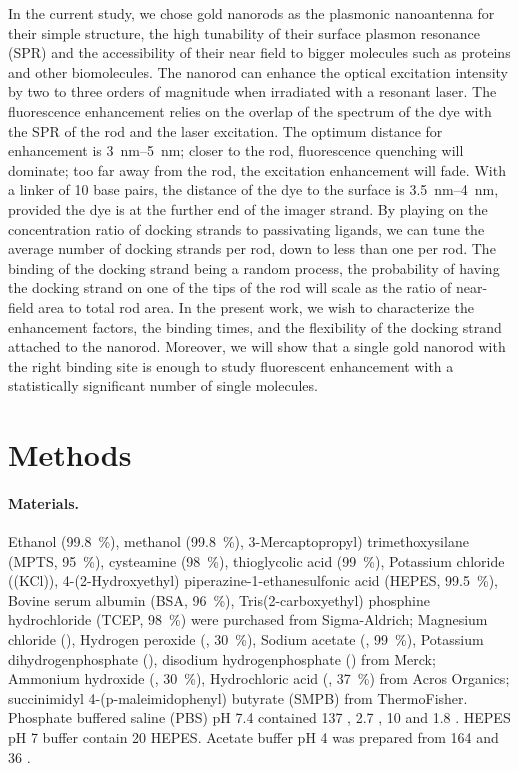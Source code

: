 In the current study, we chose gold nanorods as the plasmonic nanoantenna for their simple structure, the high tunability of their surface plasmon resonance (SPR) and the accessibility of their near field to bigger molecules such as proteins and other biomolecules.
The nanorod can enhance the optical excitation intensity by two to three orders of magnitude when irradiated with a resonant laser.
The fluorescence enhancement relies on the overlap of the spectrum of the dye with the SPR of the rod and the laser excitation.
The optimum distance for enhancement is \SIrange{3}{5}{\nm}; closer to the rod, fluorescence quenching will dominate; too far away from the rod, the excitation enhancement will fade.\cite{khatua2014resonant}
With a linker of 10 base pairs, the distance of the dye to the surface is \SIrange{3.5}{4}{\nm}, provided the dye is at the further end of the imager strand.
By playing on the concentration ratio of docking strands to passivating ligands, we can tune the average number of docking strands per rod, down to less than one per rod. The binding of the docking strand being a random process, the probability of having the docking strand on one of the tips of the rod will scale as the ratio of near-field area to total rod area.
In the present work, we wish to characterize the enhancement factors, the binding times, and the flexibility of the docking strand attached to the nanorod. Moreover, we will show that a single gold nanorod with the right binding site is enough to study fluorescent enhancement with a statistically significant number of single molecules.

\section{Methods}
\paragraph*{Materials.} Ethanol (\SI{99.8}{\percent}), methanol (\SI{99.8}{\percent}), 3-Mercaptopropyl) trimethoxysilane (MPTS, \SI{95}{\percent}), cysteamine (\SI{98}{\percent}), thioglycolic acid (\SI{99}{\percent}), Potassium chloride (\ce(KCl)), 4-(2-Hydroxyethyl) piperazine-1-ethanesulfonic acid (HEPES, \SI{99.5}{\percent}), Bovine serum albumin (BSA, \SI{96}{\percent}), Tris(2-carboxyethyl) phosphine hydrochloride (TCEP, \SI{98}{\percent}) were purchased from Sigma-Aldrich; 
Magnesium chloride (), Hydrogen peroxide (, \SI{30}{\percent}), Sodium acetate (, \SI{99}{\percent}), Potassium dihydrogenphosphate (), disodium hydrogenphosphate () from Merck;
Ammonium hydroxide (, \SI{30}{\percent}), Hydrochloric acid (, \SI{37}{\percent}) from Acros Organics;
succinimidyl 4-(p-maleimidophenyl) butyrate (SMPB) from ThermoFisher.
Phosphate buffered saline (PBS) pH 7.4 contained \SI{137}{\mM} , \SI{2.7}{\mM} , \SI{10}{\mM}  and \SI{1.8}{\mM} .
HEPES pH 7 buffer contain \SI{20}{\mM} HEPES. Acetate buffer pH 4 was prepared from \SI{164}{\mM}  and \SI{36}{\mM} .


